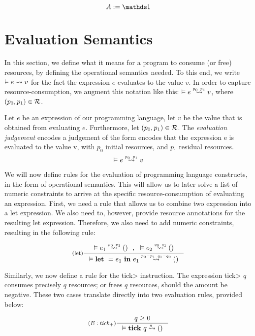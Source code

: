 \begin{definition}\label{fig:type-system}
   \[A := \unit \]
\end{definition}

\section{Evaluation Semantics}
In this section, we define what it means for a program to consume (or free) resources, by defining the operational semantics needed. To this end, we write \(\evals{}{e}{v}{}{}\) for the fact the expression \(e\) evaluates to the value \(v\). In order to capture resource-consumption, we augment this notation like this: \(\evals{}{e}{v}{p_0}{p_1}\), where \((p_0, p_1) \in \mathcal{R}\). 


\begin{definition}\label{def:evaluation-judgement}
   Let \(e\) be an expression of our programming language, let \(v\) be the value that is obtained from evaluating \(e\). Furthermore, let \((p_0, p_1) \in \mathcal{R}\). 
   The \emph{evaluation judgement} encodes a judgement of the form  encodes that the expression e is evaluated to the value v, with \(p_0\) initial resources, and \(p_1\) residual resources. 
   \[
      \evals{}{e}{v}{p_0}{p_1}
   \]
\end{definition}

We will now define rules for the evaluation of programming language constructs, in the form of operational semantics. This will allow us to later solve a list of numeric constraints to arrive at the specific resource-consumption of evaluating an expression.
First, we need a rule that allows us to combine two expression into a let expression. We also need to, however, provide resource annotations for the resulting let expression. Therefore, we also need to add numeric constraints, resulting in the following rule:

\[
   \inference[(let)]
   {\evals{}{e_1}{()}{p_0}{p_1} ~~,~~ \evals{}{e_2}{()}{q_0}{q_1}}
   {\evals{}{\letexp{}{e_1}{e_1}}{()}{p_0 - p_1}{q_1 - q_0}}
\]

Similarly, we now define a rule for the \<tick> instruction. The expression \<tick> \(q\) consumes precisely \(q\) resources; or frees \(q\) resources, should the amount be negative. These two cases translate directly into two evaluation rules, provided below:

\[
   \inference[\((E:tick_{+})\)]
   {q \geq 0}
   {\evals{}{\tick{q}}{()}{q}{}}
\]

